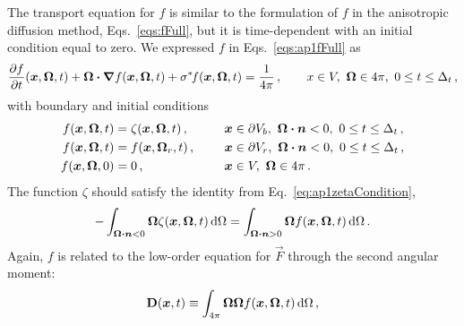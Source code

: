 The transport equation for $f$ is similar to the formulation of $f$ in the
anisotropic diffusion method, Eqs.~\eqref{eqs:fFull}, but it is time-dependent
with an initial condition equal to zero. We expressed $f$ in
Eqs.~\eqref{eqs:ap1fFull} as
\begin{equation*}
    \frac{\partial f}{\partial t}(\bm{x}, \bm{\Omega},t)
    + \bm{\Omega}\bm{\cdot} \bm{\nabla} f(\bm{x}, \bm{\Omega},t)
    + \sigma^{*\!} f(\bm{x}, \bm{\Omega},t)
  = \frac{1}{4\pi} \,,
  \qquad x \in V,\ \bm{\Omega} \in 4\pi,\  0 \le t \le \Delta_t\,,
\end{equation*}
with boundary and initial conditions
\begin{alignat*}{2}
  f(\bm{x}, \bm{\Omega}, t) &= \zeta(\bm{x}, \bm{\Omega}, t) \,,
 \qquad && \bm{x} \in \partial V_b, \ \bm{\Omega} \bm{\cdot} \bm{n} < 0
 ,\  0 \le t \le \Delta_t\,,
\\
  f(\bm{x}, \bm{\Omega}, t) &= f(\bm{x}, \bm{\Omega}_r, t) \,,
 && \bm{x} \in \partial V_r, \ \bm{\Omega} \bm{\cdot} \bm{n} < 0
 ,\  0 \le t \le \Delta_t\,,
\\
  f(\bm{x}, \bm{\Omega}, 0) &= 0 \,,
 && \bm{x} \in V, \ \bm{\Omega}\in 4\pi\,.
\end{alignat*}
The function $\zeta$ should satisfy the identity from
Eq.~\eqref{eq:ap1zetaCondition},
\begin{equation*}
- \int_{\bm{\Omega} \bm{\cdot} \bm{n} < 0}
 \bm{\Omega} \zeta(\bm{x}, \bm{\Omega}, t)\mathop{}\!\mathrm{d}\Omega
 =
 \int_{\bm{\Omega} \bm{\cdot} \bm{n} > 0}
  \bm{\Omega} f(\bm{x}, \bm{\Omega}, t)\mathop{}\!\mathrm{d}\Omega \,.
\end{equation*}
Again, $f$ is related to the low-order equation for $\vec{F}$ through the second
angular moment:
\begin{equation*}
  \mathbf{D}(\bm{x},t) \equiv \int_{4\pi} \bm{\Omega} \bm{\Omega}
  f(\bm{x}, \bm{\Omega},t) \mathop{}\!\mathrm{d}\Omega \,,
\end{equation*}

